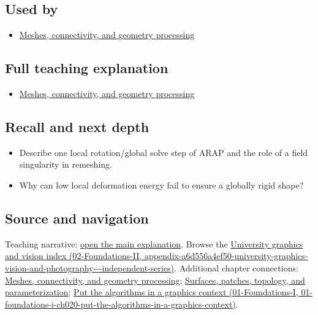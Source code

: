 \subsection{Used by}\label{appendix-7107009c505b-used-by}

\begin{itemize}
\tightlist
\item
  \hyperref[03-visual-computing-i-ch002-meshes-connectivity-and-geometry-processing]{Meshes, connectivity, and geometry processing}
\end{itemize}

\subsection{Full teaching explanation}\label{appendix-7107009c505b-full-teaching-explanation}

\begin{itemize}
\tightlist
\item
  \hyperref[03-visual-computing-i-ch002-meshes-connectivity-and-geometry-processing]{Meshes, connectivity, and geometry processing}
\end{itemize}

\subsection{Recall and next depth}\label{appendix-7107009c505b-recall-and-next-depth}

\begin{itemize}
\tightlist
\item
  Describe one local rotation/global solve step of ARAP and the role of a field singularity in remeshing.
\item
  Why can low local deformation energy fail to ensure a globally rigid shape?
\end{itemize}

\subsection{Source and navigation}\label{appendix-7107009c505b-source-and-navigation}

Teaching narrative: \hyperref[03-visual-computing-i-ch002-meshes-connectivity-and-geometry-processing]{open the main explanation}. Browse the \href{../02-Foundations-II/main.pdf\#nameddest=appendix-a6d556a4ef50-university-graphics-vision-and-photography---independent-series}{University graphics and vision index (02-Foundations-II, appendix-a6d556a4ef50-university-graphics-vision-and-photography-\/-\/-independent-series)}. Additional chapter connections: \hyperref[03-visual-computing-i-ch002-meshes-connectivity-and-geometry-processing]{Meshes, connectivity, and geometry processing}; \hyperref[03-visual-computing-i-ch002-surfaces-patches-topology-and-parameterization]{Surfaces, patches, topology, and parameterization}; \href{../01-Foundations-I/main.pdf\#nameddest=01-foundations-i-ch020-put-the-algorithms-in-a-graphics-context}{Put the algorithms in a graphics context (01-Foundations-I, 01-foundations-i-ch020-put-the-algorithms-in-a-graphics-context)}.

